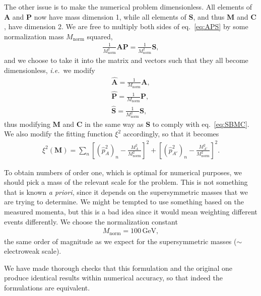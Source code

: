 \documentclass[twoside,english]{uiofysmaster}
\begin{document}
The other issue is to make the numerical problem dimensionless. All elements of $\mathbf{A}$ and $\mathbf{P}$ now have mass dimension 1, while all elements of $\mathbf{S}$, and thus $\mathbf{M}$ and $\mathbf{C}$, have dimension 2. We are free to multiply both sides of eq.\ \eqref{eq:APS} by some normalization mass $M_\mathrm{norm}$ squared,
\begin{align}
	\frac{1}{M_\mathrm{norm}^2} \mathbf{A}\mathbf{P} = \frac{1}{M_\mathrm{norm}^2} \mathbf{S},
\end{align}
and we choose to take it into the matrix and vectors such that they all become dimensionless, {\it i.e.}\ we modify
\begin{align}
	\mathbf{\hat A} = \frac{1}{M_\mathrm{norm}}\mathbf{A},\nonumber \\
	\mathbf{\hat P} = \frac{1}{M_\mathrm{norm}}\mathbf{P},\label{eq:vectors_normalized}\\
	\mathbf{\hat S} = \frac{1}{M_\mathrm{norm}^2}\mathbf{S},\nonumber 
\end{align}
thus modifying $\mathbf{M}$ and $\mathbf{C}$ in the same way as $\mathbf{S}$ to comply with eq.\ \eqref{eq:SBMC}. We also modify the fitting function $\xi^2$ accordingly, so that it becomes
\begin{align}
	\xi^2(\mathbf{M}) = \sum_n \left[(\hat p_{A}^2)_n - \frac{M_A^2}{M_\mathrm{norm}^2}\right]^2 + \left[(\hat p_{A'}^2)_n - \frac{M_{A'}^2}{M_\mathrm{norm}^2}\right]^2.\label{eq:xisquared_modified}
\end{align}

To obtain numbers of order one, which is optimal for numerical purposes, we should pick a mass of the relevant scale for the problem. This is not something that is known {\it a priori}, since it depends on the supersymmetric masses that we are trying to determine. We might be tempted to use something based on the measured momenta, but this is a bad idea since it would mean weighting different events differently. We choose the normalization constant
\begin{align}
	M_\mathrm{norm} = 100 \,\mathrm{GeV},
\end{align}
the same order of magnitude as we expect for the supersymmetric masses ($\sim$ electroweak scale). 

We have made thorough checks that this formulation and the original one produce identical results within numerical accuracy, so that indeed the formulations are equivalent.
\end{document}
